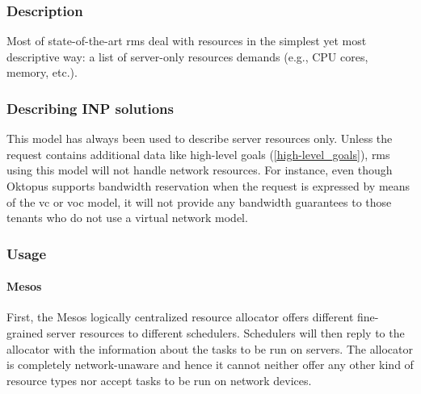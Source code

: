 \subsubsection{Description}
Most of state-of-the-art \glspl{rm} \cite{mesos, borg, omega, kubernetes, yarn} deal with resources in the simplest yet most descriptive way: a list of server-only resources demands (e.g., CPU cores, memory, etc.).

\subsubsection{Describing INP solutions}
This model has always been used to describe server resources only.
Unless the request contains additional data like high-level goals (\autoref{high-level_goals}), \glspl{rm} using this model will not handle network resources.
For instance, even though Oktopus \cite{oktopus} supports bandwidth reservation when the request is expressed by means of the \gls{vc} or \gls{voc} model, it will not provide any bandwidth guarantees to those tenants who do not use a virtual network model.

\subsubsection{Usage}
\paragraph{Mesos \texorpdfstring{\cite{mesos}}{}}
First, the Mesos \cite{mesos} logically centralized resource allocator offers different fine-grained server resources to different schedulers.
Schedulers will then reply to the allocator with the information about the tasks to be run on servers.
The allocator is completely network-unaware and hence it cannot neither offer any other kind of resource types nor accept tasks to be run on network devices.

